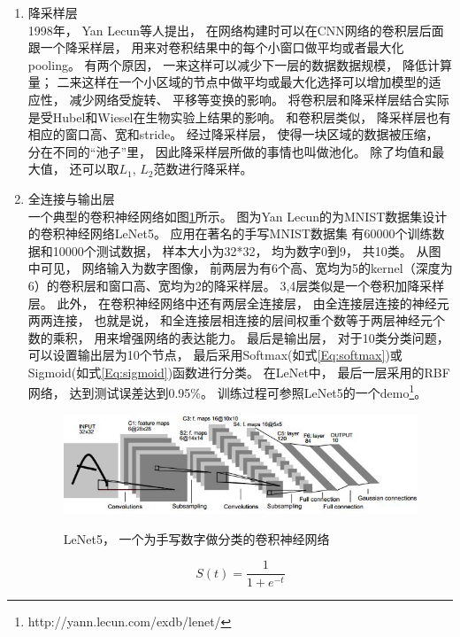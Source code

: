\begin{enumerate}
\item 降采样层\\
1998年， Yan Lecun等人提出， 在网络构建时可以在CNN网络的卷积层后面跟一个降采样层， 用来对卷积结果中的每个小窗口做平均或者最大化pooling。 有两个原因， 一来这样可以减少下一层的数据数据规模， 降低计算量； 二来这样在一个小区域的节点中做平均或最大化选择可以增加模型的适应性， 减少网络受旋转、 平移等变换的影响。 将卷积层和降采样层结合实际是受Hubel和Wiesel在生物实验上结果的影响\cite{hubel1962receptive}。 和卷积层类似， 降采样层也有相应的窗口高、宽和stride。 经过降采样层， 使得一块区域的数据被压缩， 分在不同的“池子”里， 因此降采样层所做的事情也叫做池化。 除了均值和最大值， 还可以取$L_1$, $L_2$范数进行降采样。



\item 全连接与输出层\\
一个典型的卷积神经网络如图\ref{fig:lenet}所示。 图为Yan Lecun的为MNIST数据集设计的卷积神经网络LeNet5\cite{lecun1998gradient}。 应用在著名的手写MNIST数据集\cite{lecun1998mnist} 有60000个训练数据和10000个测试数据， 样本大小为32*32， 均为数字0到9， 共10类。 从图中可见， 网络输入为数字图像， 前两层为有6个高、宽均为5的kernel（深度为6）的卷积层和窗口高、宽均为2的降采样层。 3,4层类似是一个卷积加降采样层。 此外， 在卷积神经网络中还有两层全连接层， 由全连接层连接的神经元两两连接， 也就是说， 和全连接层相连接的层间权重个数等于两层神经元个数的乘积， 用来增强网络的表达能力。 最后是输出层， 对于10类分类问题， 可以设置输出层为10个节点， 最后采用Softmax(如式\ref{Eq:softmax})或Sigmoid(如式\ref{Eq:sigmoid})函数进行分类。 在LeNet中， 最后一层采用的RBF网络， 达到测试误差达到0.95\%。 训练过程可参照LeNet5的一个demo\footnote{http://yann.lecun.com/exdb/lenet/}。

\begin{figure}[htb]
  \centering
  \includegraphics[scale=0.7]{Pictures/CNN/lenet.jpg}\\
  \caption{LeNet5， 一个为手写数字做分类的卷积神经网络\cite{lecun1998gradient}}\label{fig:lenet}
\end{figure}


\begin{equation}
S(t)=\frac{1}{1+e^{-t}}\label{Eq:sigmoid}
\end{equation}


\end{enumerate}
